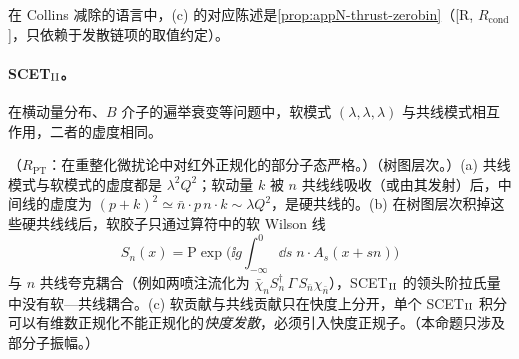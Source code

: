 在 Collins 减除的语言中，(c) 的对应陈述是\cref{prop:appN-thrust-zerobin}（[R, $R_{\mathrm{cond}}$]，只依赖于发散链项的取值约定）。

\paragraph{SCET$_{\rm II}$。}在横动量分布、$B$ 介子的遍举衰变等问题中，软模式 $(\lambda,\lambda,\lambda)$ 与共线模式相互作用，二者的虚度相同。

\begin{proposition}\label{prop:scet-scet2}
（$R_{\mathrm{PT}}$：在重整化微扰论中对红外正规化的部分子态严格。）（树图层次。）(a) 共线模式与软模式的虚度都是 $\lambda^2Q^2$；软动量 $k$ 被 $n$ 共线线吸收（或由其发射）后，中间线的虚度为 $(p+k)^2\simeq\bar n\cdot p\,n\cdot k\sim\lambda Q^2$，是硬共线的。(b) 在树图层次积掉这些硬共线线后，软胶子只通过算符中的软 Wilson 线
\begin{equation}\label{eq:scet-Sn}
S_n(x)=\mathrm P\exp\Big(\ii g\int_{-\infty}^0\dd s\;n\cdot A_s(x+sn)\Big)
\end{equation}
与 $n$ 共线夸克耦合（例如两喷注流化为 $\bar\chi_nS_n^\dagger\,\Gamma\,S_{\bar n}\chi_{\bar n}$），SCET$_{\rm II}$ 的领头阶拉氏量中没有软—共线耦合\cite{BauerEtAl2002,Hill:2002vw}。(c) 软贡献与共线贡献只在快度上分开，单个 SCET$_{\rm II}$ 积分可以有维数正规化不能正规化的\emph{快度发散}，必须引入快度正规子\cite[第~3、4~节]{ChiuEtAl2012b}。（本命题只涉及部分子振幅。）
\end{proposition}


